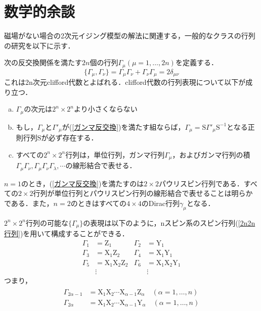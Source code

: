 \documentclass[a4paper,11pt]{jsreport}
\begin{document}
\section{数学的余談}
磁場がない場合の2次元イジング模型の解法に関連する，一般的なクラスの行列の研究を以下に示す．\par
次の反交換関係を満たす$2n$個の行列$\Gamma_{\mu} (\mu = 1,\dots,2n)$を定義する．
\begin{equation}
  \{\Gamma_{\mu}, \Gamma_{\nu}\}
  =\Gamma_{\mu} \Gamma_{\nu} + \Gamma_{\nu} \Gamma_{\mu} 
  = 2\delta_{\mu \nu}
  \label{ガンマ反交換}
\end{equation}
これは2n次元clifford代数とよばれる．clifford代数の行列表現について以下が成り立つ．
\begin{enumerate}[(a)]
  \item $\Gamma_{\mu}$の次元は$2^n \times 2^n$より小さくならない
  \item もし，$\Gamma_{\mu}$と$\Gamma'_{\mu}$が(\ref{ガンマ反交換})を満たす組ならば，$\Gamma_{\mu} = \mathrm{S} \Gamma'_{\mu} \mathrm{S}^{-1}$となる正則行列$\mathrm{S}$が必ず存在する．
  \item すべての$2^n \times 2^n$行列は，単位行列，ガンマ行列$\Gamma_{\mu}$，およびガンマ行列の積$\Gamma_{\mu} \Gamma_{\nu}, \Gamma_{\mu} \Gamma_{\nu} \Gamma_{\lambda}, \cdots$の線形結合で表せる．
\end{enumerate}
$n=1$のとき，(\ref{ガンマ反交換})を満たすのは$2 \times 2$パウリスピン行列である．すべての$2 \times 2$行列が単位行列とパウリスピン行列の線形結合で表せることは明らかである．また，$n=2$のときはすべての$4 \times 4$のDirac行列$\gamma_{\mu}$となる．\par
$2^n \times 2^n$行列の可能な$\{\Gamma_{\mu}\}$の表現は以下のように，nスピン系のスピン行列(\ref{2n2n行列})を用いて構成することができる．
\begin{align*}
  \Gamma_1 &= \mathrm{Z}_1 & \Gamma_2 &= \mathrm{Y}_1 \\
  \Gamma_3 &= \mathrm{X}_1 \mathrm{Z}_2 & \Gamma_4 &= \mathrm{X}_1 \mathrm{Y}_1 \\
  \Gamma_5 &= \mathrm{X}_1 \mathrm{X}_2 \mathrm{Z}_2 & \Gamma_6 &= \mathrm{X}_1 \mathrm{X}_2 \mathrm{Y}_1 \\
  &\vdots & &\vdots
\end{align*}
つまり，
\begin{align}
  \begin{split}
    \Gamma_{2\alpha-1} &= \mathrm{X}_1 \mathrm{X}_2 \cdots \mathrm{X}_{\alpha-1} \mathrm{Z}_{\alpha} \quad (\alpha=1,\dots,n) \\
    \Gamma_{2\alpha} &= \mathrm{X}_1 \mathrm{X}_2 \cdots \mathrm{X}_{\alpha-1} \mathrm{Y}_{\alpha} \quad (\alpha=1,\dots,n)
  \end{split}
\end{align}
\end{document}
